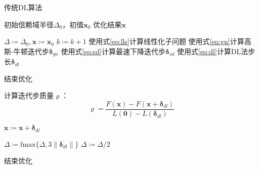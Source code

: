 \begin{algorithm}[htb!]
\caption{传统DL算法}
\begin{algorithmic}
    \Require 初始信赖域半径$\Delta_0$，初值$\bm{x}_0$
    \Ensure 优化结果$\bm{x}$

    \State $\Delta \coloneqq \Delta_0, \bm{x} \coloneqq \bm{x}_0$
        \State $k \coloneqq k+1$
        \State 使用式\eqref{eq:lls}计算线性化子问题
        \State 使用式\eqref{eq:gn}计算高斯-牛顿迭代步$\bm{\delta}_{gn}$
        \State 使用式\eqref{eq:sd}计算最速下降迭代步$\bm{\delta}_{sd}$
        \State 使用式\eqref{eq:dl}计算DL法步长$\bm{\delta}_{dl}$

            \State 结束优化
        \EndIf

        \State 计算迭代步质量$\varrho$：
        \[
            \varrho = \frac {F(\bm{x})-F(\bm{x}+\bm{\delta}_{dl})}
                            {L(\bm{0})-L(\bm{\delta}_{dl})}
        \]

            \State $\bm{x} \coloneqq \bm{x} + \bm{\delta}_{dl}$
        \EndIf

            \State $\Delta \coloneqq \text{fmax}\{\Delta,3\left\|\bm{\delta}_{dl}\right\|\}$
            \State $\Delta \coloneqq \Delta/2$
        \EndIf

            \State 结束优化
        \EndIf
    \EndFor
\end{algorithmic}
\label{alg:dogleg}
\end{algorithm}
